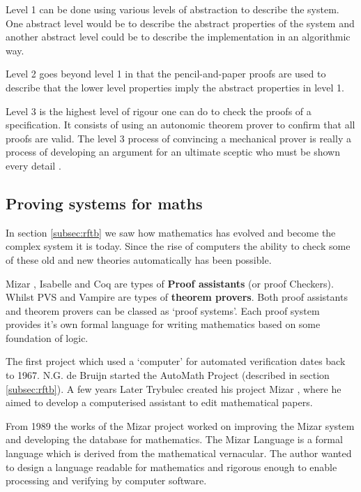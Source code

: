 Level 1 can be done using various levels of abstraction to describe the system. One
abstract level would be to describe the abstract properties of the system and
another abstract level could be to describe the implementation in an algorithmic
way.

Level 2 goes beyond level 1 in that the pencil-and-paper proofs are used to
describe that the lower level properties imply the abstract properties in level
1.

Level 3 is the highest level of rigour one can do to check the proofs of a
specification. It consists of using an autonomic theorem prover to confirm that
all proofs are valid. The level 3 process of convincing a mechanical prover is
really a process of developing an argument for an ultimate sceptic who must be
shown every detail \cite{encyclopedia}.

\subsection{Proving systems for maths}

In section \ref{subsec:rftb} we saw how mathematics has evolved and become the
complex system it is today. Since the rise of computers the ability to check
some of these old and new theories automatically has been possible.

Mizar \cite{mizar}, Isabelle \cite{isabelle} and Coq \cite{coq} are types of
\textbf{Proof assistants} (or proof Checkers). Whilst PVS and Vampire are types
of \textbf{theorem provers}. Both proof assistants and theorem provers can be
classed as `proof systems'. Each proof system provides it's own formal language
for writing mathematics based on some foundation of logic.

The first project which used a `computer' for automated verification dates back
to 1967. N.G. de Bruijn started the AutoMath Project (described in section
\ref{subsec:rftb}). A few years Later Trybulec created his project Mizar
\cite{mizar}, where he aimed to develop a computerised assistant to edit
mathematical papers.

From 1989 the works of the Mizar project worked on improving the Mizar system
and developing the database for mathematics. The Mizar Language is a formal
language which is derived from the mathematical vernacular. The author wanted to
design a language readable for mathematics and rigorous enough to enable
processing and verifying by computer software.


